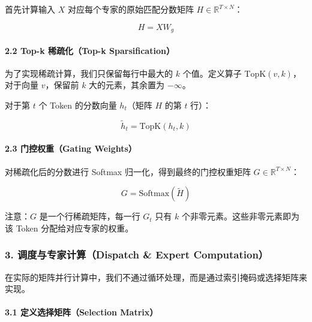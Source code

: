 首先计算输入 \(X\) 对应每个专家的原始匹配分数矩阵 \(H \in \mathbb{R}^{T \times N}\)：

\[
H = XW_g
\]

\hypertarget{top-k-ux7a00ux758fux5316top-k-sparsification}{%
\paragraph{2.2 Top-k 稀疏化（Top-k Sparsification）}\label{top-k-ux7a00ux758fux5316top-k-sparsification}}

为了实现稀疏计算，我们只保留每行中最大的 \(k\) 个值。定义算子 \(\mathrm{TopK}(v,k)\)，对于向量 \(v\)，保留前 \(k\) 大的元素，其余置为 \(-\infty\)。

对于第 \(t\) 个 Token 的分数向量 \(h_t\)（矩阵 \(H\) 的第 \(t\) 行）：

\[
\tilde{h}_t = \mathrm{TopK}(h_t,k)
\]

\hypertarget{ux95e8ux63a7ux6743ux91cdgating-weights}{%
\paragraph{2.3 门控权重（Gating Weights）}\label{ux95e8ux63a7ux6743ux91cdgating-weights}}

对稀疏化后的分数进行 Softmax 归一化，得到最终的门控权重矩阵 \(G \in \mathbb{R}^{T \times N}\)：

\[
G = \mathrm{Softmax}(\tilde{H})
\]

注意：\(G\) 是一个行稀疏矩阵，每一行 \(G_t\) 只有 \(k\) 个非零元素。这些非零元素即为该 Token 分配给对应专家的权重。

\hypertarget{ux8c03ux5ea6ux4e0eux4e13ux5bb6ux8ba1ux7b97dispatch-expert-computation}{%
\subsubsection{3. 调度与专家计算（Dispatch \& Expert Computation）}\label{ux8c03ux5ea6ux4e0eux4e13ux5bb6ux8ba1ux7b97dispatch-expert-computation}}

在实际的矩阵并行计算中，我们不通过循环处理，而是通过索引掩码或选择矩阵来实现。

\hypertarget{ux5b9aux4e49ux9009ux62e9ux77e9ux9635selection-matrix}{%
\paragraph{3.1 定义选择矩阵（Selection Matrix）}\label{ux5b9aux4e49ux9009ux62e9ux77e9ux9635selection-matrix}}


